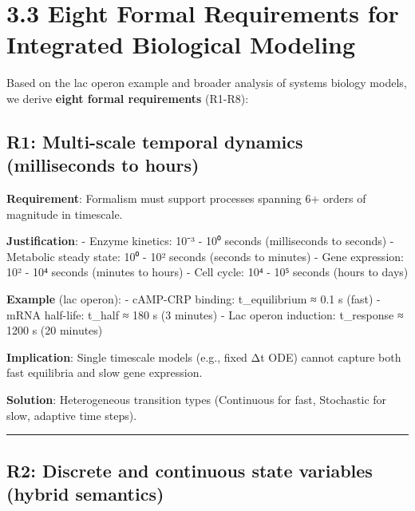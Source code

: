 \hypertarget{eight-formal-requirements-for-integrated-biological-modeling}{%
\section{3.3 Eight Formal Requirements for Integrated Biological
Modeling}\label{eight-formal-requirements-for-integrated-biological-modeling}}

Based on the lac operon example and broader analysis of systems biology
models, we derive \textbf{eight formal requirements} (R1-R8):

\hypertarget{r1-multi-scale-temporal-dynamics-milliseconds-to-hours}{%
\subsection{\texorpdfstring{\textbf{R1: Multi-scale temporal dynamics}
(milliseconds to
hours)}{R1: Multi-scale temporal dynamics (milliseconds to hours)}}\label{r1-multi-scale-temporal-dynamics-milliseconds-to-hours}}

\textbf{Requirement}: Formalism must support processes spanning 6+
orders of magnitude in timescale.

\textbf{Justification}: - Enzyme kinetics: 10⁻³ - 10⁰ seconds
(milliseconds to seconds) - Metabolic steady state: 10⁰ - 10² seconds
(seconds to minutes) - Gene expression: 10² - 10⁴ seconds (minutes to
hours) - Cell cycle: 10⁴ - 10⁵ seconds (hours to days)

\textbf{Example} (lac operon): - cAMP-CRP binding: t\_equilibrium ≈ 0.1
s (fast) - mRNA half-life: t\_half ≈ 180 s (3 minutes) - Lac operon
induction: t\_response ≈ 1200 s (20 minutes)

\textbf{Implication}: Single timescale models (e.g., fixed Δt ODE)
cannot capture both fast equilibria and slow gene expression.

\textbf{Solution}: Heterogeneous transition types (Continuous for fast,
Stochastic for slow, adaptive time steps).

\begin{center}\rule{0.5\linewidth}{0.5pt}\end{center}

\hypertarget{r2-discrete-and-continuous-state-variables-hybrid-semantics}{%
\subsection{\texorpdfstring{\textbf{R2: Discrete and continuous state
variables} (hybrid
semantics)}{R2: Discrete and continuous state variables (hybrid semantics)}}\label{r2-discrete-and-continuous-state-variables-hybrid-semantics}}

